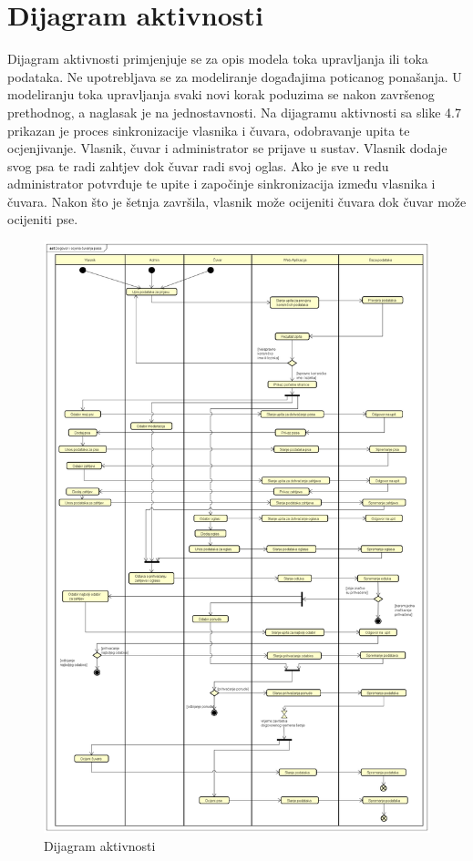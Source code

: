 			\eject 
		
		\section{Dijagram aktivnosti}
			
			Dijagram aktivnosti primjenjuje se za opis modela toka upravljanja ili toka podataka. Ne upotrebljava se za modeliranje događajima poticanog ponašanja. U
			modeliranju toka upravljanja svaki novi korak poduzima se nakon završenog prethodnog, a naglasak je na jednostavnosti. Na dijagramu aktivnosti sa slike 4.7 prikazan je proces sinkronizacije vlasnika i čuvara, odobravanje upita te ocjenjivanje. Vlasnik, čuvar i administrator se prijave u sustav. Vlasnik dodaje svog psa te radi zahtjev dok čuvar radi svoj oglas.
			Ako je sve u redu administrator potvrđuje te upite i započinje sinkronizacija između vlasnika i čuvara. Nakon što je šetnja završila, vlasnik može ocijeniti čuvara dok čuvar može ocijeniti pse.
			
			\newpage
			
			\begin{figure}[H]
				\centering
				\includegraphics[width=15cm]{slike/dijagram_aktivnosti}
				\caption{Dijagram aktivnosti}
				\label{fig:Activity-Diagram}
			\end{figure}
			
